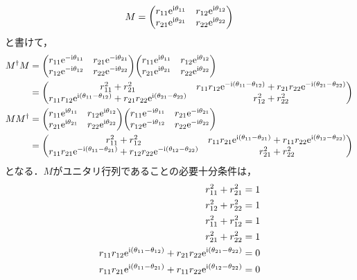 \documentclass{report}
\begin{document}
    \begin{align}
      M = \mqty(
        r_{11}\e^{\i\theta_{11}} & r_{12}\e^{\i\theta_{12}} \\ 
        r_{21}\e^{\i\theta_{21}} & r_{22}\e^{\i\theta_{22}} \\ 
      )
    \end{align}
    と書けて，
    \begin{align}
      M^{\dag}M &= \mqty(
        r_{11}\e^{-\i\theta_{11}} & r_{21}\e^{-\i\theta_{21}} \\ 
        r_{12}\e^{-\i\theta_{12}} & r_{22}\e^{-\i\theta_{22}} \\ 
      )\mqty(
        r_{11}\e^{\i\theta_{11}} & r_{12}\e^{\i\theta_{12}} \\ 
        r_{21}\e^{\i\theta_{21}} & r_{22}\e^{\i\theta_{22}} \\ 
      ) \\ 
      &= \mqty(
        r_{11}^2 + r_{21}^2 & r_{11}r_{12}\e^{-\i(\theta_{11} - \theta_{12})} + r_{21}r_{22}\e^{-\i(\theta_{21} - \theta_{22})} \\ 
        r_{11}r_{12}\e^{\i(\theta_{11} - \theta_{12})} + r_{21}r_{22}\e^{\i(\theta_{21} - \theta_{22})} & r_{12}^2 + r_{22}^2 \\ 
      ) \\ 
      MM^{\dag} &= \mqty(
        r_{11}\e^{\i\theta_{11}} & r_{12}\e^{\i\theta_{12}} \\ 
        r_{21}\e^{\i\theta_{21}} & r_{22}\e^{\i\theta_{22}} \\ 
      )\mqty(
        r_{11}\e^{-\i\theta_{11}} & r_{21}\e^{-\i\theta_{21}} \\ 
        r_{12}\e^{-\i\theta_{12}} & r_{22}\e^{-\i\theta_{22}} \\ 
      ) \\ 
      &= \mqty(
        r_{11}^2 + r_{12}^2 & r_{11}r_{21}\e^{\i(\theta_{11} - \theta_{21})} + r_{11}r_{22}\e^{\i(\theta_{12} - \theta_{22})} \\ 
        r_{11}r_{21}\e^{-\i(\theta_{11} - \theta_{21})} + r_{12}r_{22}\e^{-\i(\theta_{12} - \theta_{22})} & r_{21}^2 + r_{22}^2 \\ 
      )
    \end{align}
    となる．$M$がユニタリ行列であることの必要十分条件は，
    \begin{align}
      r_{11}^2 + r_{21}^2 = 1 \label{r11-r21}\\ 
      r_{12}^2 + r_{22}^2 = 1 \label{r12-r22}\\ 
      r_{11}^2 + r_{12}^2 = 1 \label{r11-r12}\\ 
      r_{21}^2 + r_{22}^2 = 1 \label{r21-r22}\\ 
      r_{11}r_{12}\mathrm{e}^{\mathrm{i}(\theta_{11} - \theta_{12})} + r_{21}r_{22}\mathrm{e}^{\mathrm{i}(\theta_{21} - \theta_{22})} = 0 \label{angle-1}\\ 
      r_{11}r_{21}\mathrm{e}^{\mathrm{i}(\theta_{11} - \theta_{21})} + r_{11}r_{22}\mathrm{e}^{\mathrm{i}(\theta_{12} - \theta_{22})} = 0 \label{angle-2}
    \end{align}
\end{document}

